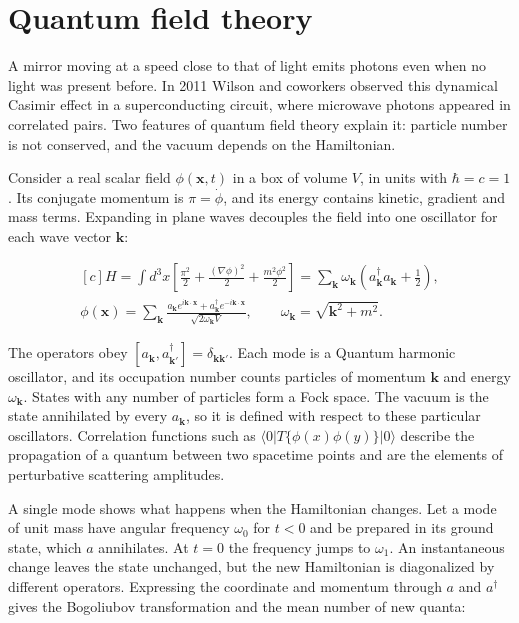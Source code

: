 \documentclass[11pt,oneside]{book}
\newenvironment{centeredalign}{\[\begin{gathered}[c]}{\end{gathered}\]}
\begin{document}
\clearpage

\section{Quantum field theory}

\label{topic:quantum-field-theory}

A mirror moving at a speed close to that of light emits photons even when no light was present before. In 2011 Wilson and coworkers observed this dynamical Casimir effect in a superconducting circuit, where microwave photons appeared in correlated pairs. Two features of quantum field theory explain it: particle number is not conserved, and the vacuum depends on the Hamiltonian.

Consider a real scalar field \(\phi(\mathbf x,t)\) in a box of volume \(V\), in units with \(\hbar=c=1\). Its conjugate momentum is \(\pi=\dot\phi\), and its energy contains kinetic, gradient and mass terms. Expanding in plane waves decouples the field into one oscillator for each wave vector \(\mathbf k\):

\begin{centeredalign}
H=\int d^3x\left[\frac{\pi^2}{2}+\frac{(\nabla\phi)^2}{2}+\frac{m^2\phi^2}{2}\right]
=\sum_{\mathbf k}\omega_{\mathbf k}\left(a_{\mathbf k}^\dagger a_{\mathbf k}+\frac12\right),\\
\phi(\mathbf x)=\sum_{\mathbf k}\frac{a_{\mathbf k}e^{i\mathbf k\cdot\mathbf x}
+a_{\mathbf k}^\dagger e^{-i\mathbf k\cdot\mathbf x}}{\sqrt{2\omega_{\mathbf k}V}},\qquad
\omega_{\mathbf k}=\sqrt{\mathbf k^2+m^2}.
\end{centeredalign}

The operators obey \([a_{\mathbf k},a_{\mathbf k'}^\dagger]=\delta_{\mathbf k\mathbf k'}\). Each mode is a Quantum harmonic oscillator, and its occupation number counts particles of momentum \(\mathbf k\) and energy \(\omega_{\mathbf k}\). States with any number of particles form a Fock space. The vacuum is the state annihilated by every \(a_{\mathbf k}\), so it is defined with respect to these particular oscillators. Correlation functions such as \(\langle0|T\{\phi(x)\phi(y)\}|0\rangle\) describe the propagation of a quantum between two spacetime points and are the elements of perturbative scattering amplitudes.

A single mode shows what happens when the Hamiltonian changes. Let a mode of unit mass have angular frequency \(\omega_0\) for \(t<0\) and be prepared in its ground state, which \(a\) annihilates. At \(t=0\) the frequency jumps to \(\omega_1\). An instantaneous change leaves the state unchanged, but the new Hamiltonian is diagonalized by different operators. Expressing the coordinate and momentum through \(a\) and \(a^\dagger\) gives the Bogoliubov transformation and the mean number of new quanta:
\end{document}
